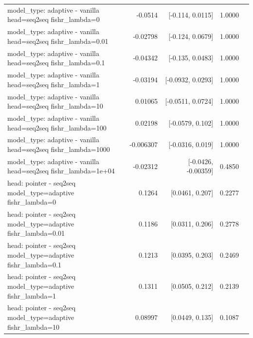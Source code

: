\documentclass[10pt]{article}
\makeatletter
\newcommand{\stackcell}[1]{\begin{tabular}[t]{@{}l@{}}#1\end{tabular}}
\makeatother
\begin{document}
{\begin{longtable}{lrrrl}
\stackcell{model\_type: adaptive - vanilla\\\footnotesize head=seq2seq fishr\_lambda=0 } & -0.0514 & [-0.114, 0.0115] & 1.0000 & \\
\stackcell{model\_type: adaptive - vanilla\\\footnotesize head=seq2seq fishr\_lambda=0.01 } & -0.02798 & [-0.124, 0.0679] & 1.0000 & \\
\stackcell{model\_type: adaptive - vanilla\\\footnotesize head=seq2seq fishr\_lambda=0.1 } & -0.04342 & [-0.135, 0.0483] & 1.0000 & \\
\stackcell{model\_type: adaptive - vanilla\\\footnotesize head=seq2seq fishr\_lambda=1 } & -0.03194 & [-0.0932, 0.0293] & 1.0000 & \\
\stackcell{model\_type: adaptive - vanilla\\\footnotesize head=seq2seq fishr\_lambda=10 } & 0.01065 & [-0.0511, 0.0724] & 1.0000 & \\
\stackcell{model\_type: adaptive - vanilla\\\footnotesize head=seq2seq fishr\_lambda=100 } & 0.02198 & [-0.0579, 0.102] & 1.0000 & \\
\stackcell{model\_type: adaptive - vanilla\\\footnotesize head=seq2seq fishr\_lambda=1000 } & -0.006307 & [-0.0316, 0.019] & 1.0000 & \\
\stackcell{model\_type: adaptive - vanilla\\\footnotesize head=seq2seq fishr\_lambda=1e+04 } & -0.02312 & [-0.0426, -0.00359] & 0.4850 & \\
\stackcell{head: pointer - seq2seq\\\footnotesize model\_type=adaptive fishr\_lambda=0 } & 0.1264 & [0.0461, 0.207] & 0.2277 & \\
\stackcell{head: pointer - seq2seq\\\footnotesize model\_type=adaptive fishr\_lambda=0.01 } & 0.1186 & [0.0311, 0.206] & 0.2778 & \\
\stackcell{head: pointer - seq2seq\\\footnotesize model\_type=adaptive fishr\_lambda=0.1 } & 0.1213 & [0.0395, 0.203] & 0.2469 & \\
\stackcell{head: pointer - seq2seq\\\footnotesize model\_type=adaptive fishr\_lambda=1 } & 0.1311 & [0.0505, 0.212] & 0.2139 & \\
\stackcell{head: pointer - seq2seq\\\footnotesize model\_type=adaptive fishr\_lambda=10 } & 0.08997 & [0.0449, 0.135] & 0.1087 & \\

\end{longtable}}
\end{document}

